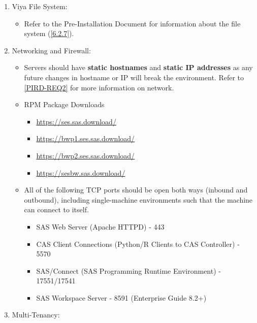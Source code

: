 \begin{enumerate}
    \item Viya File System:
    \begin{itemize}
        \item Refer to the Pre-Installation Document for information about the file system (\ref{6.2.7}). 
    \end{itemize}
    \item Networking and Firewall:
    \begin{itemize}
        \item Servers should have \textbf{static hostnames} and \textbf{static IP addresses} as any future changes in hostname or IP will break the environment. Refer to \ref{PIRD-REQ2} for more information on network.
        \item RPM Package Downloads
        \begin{itemize}
            \item \href{https://ses.sas.download/}{https://ses.sas.download/}
            \item \href{https://bwp1.ses.sas.download/}{https://bwp1.ses.sas.download/}
            \item \href{https://bwp2.ses.sas.download/}{https://bwp2.ses.sas.download/}
            \item \href{https://sesbw.sas.download/}{https://sesbw.sas.download/}
        \end{itemize}
        \item All of the following TCP ports should be open both ways (inbound and outbound), including single-machine environments such that the machine can connect to itself. 
        \begin{itemize}
            \item SAS Web Server (Apache HTTPD) - 443
            \item CAS Client Connections (Python/R Clients to CAS Controller) - 5570
            \item SAS/Connect (SAS Programming Runtime Environment) - 17551/17541
            \item SAS Workspace Server - 8591 (Enterprise Guide 8.2+)
        \end{itemize}
    \end{itemize}
    \item Multi-Tenancy:
    \begin{itemize}

\end{itemize}
\end{enumerate}

